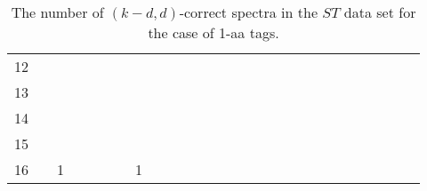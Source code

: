 \documentclass{article}[12pt]
\begin{document}
\begin{landscape}
\begin{table}[h]
{\begin{tabular}{|c|c|
c|c|c|c|c|c|c|c|c|c|c|c|c|c|c|c|c|c|c|c|c|c|c|c|c|}
12  &  &  &  &  &  &  &  &  &  &  &  &  &  &  &  &  &  &  &  &  &  &  &  &  &  & \\

13  &  &  &  &  &  &  &  &  &  &  &  &  &  &  &  &  &  &  &  &  &  &  &  &  &  & \\

14  &  &  &  &  &  &  &  &  &  &  &  &  &  &  &  &  &  &  &  &  &  &  &  &  &  & \\

15  &  &  &  &  &  &  &  &  &  &  &  &  &  &  &  &  &  &  &  &  &  &  &  &  &  & \\

16  &  & 1 &  &  &  &  & 1 &  &  &  &  &  &  &  &  &  &  &  &  &  &  &  &  &  &  & \\

  \hline
\end{tabular}
\par}
\centering
\caption{The number of $(k-d,d)$-correct spectra in the $ST$ data set for the case of 1-aa tags.}
\vspace{3mm}
\label{table:kd-1-correct-ST}
\end{table}
\end{landscape}
\end{document}
